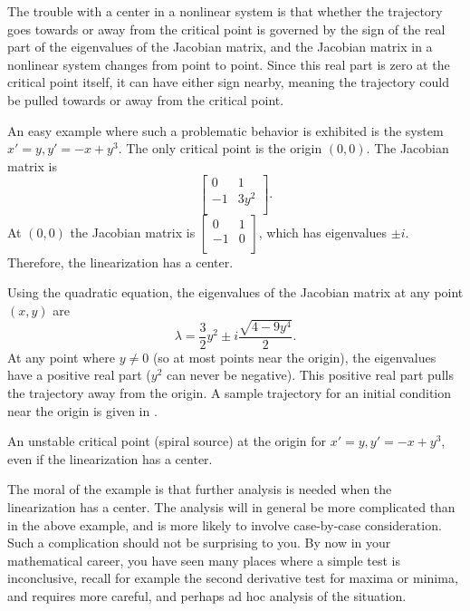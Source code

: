 The trouble with a center in a nonlinear system is that whether the
trajectory goes towards or away from the critical point is governed by the
sign of the real part of the eigenvalues of the Jacobian matrix, and the Jacobian
matrix
in a nonlinear system changes from point to point.  Since this real
part is zero at the critical point itself, it can have either sign nearby,
meaning the trajectory could be pulled towards or away from the critical
point.

\begin{example}
An easy example where such a problematic behavior is exhibited is the system
$x'=y, y' = -x+y^3$.  The only critical point
is the origin $(0,0)$.  The Jacobian matrix is 
\begin{equation*}
\begin{bmatrix}
0 & 1 \\
-1 & 3 y^2 \\
\end{bmatrix} .
\end{equation*}
At 
$(0,0)$ the Jacobian matrix is
$\left[ \begin{smallmatrix}
0 & 1 \\
-1 & 0 \\
\end{smallmatrix} \right]$, which has eigenvalues $\pm i$.  Therefore, the
linearization has a center.

Using the quadratic equation, the eigenvalues of the
Jacobian matrix at any point $(x,y)$ are
\begin{equation*}
\lambda = 
\frac{3}{2}y^2 \pm
i
\frac{\sqrt{4-9y^4}}{2} .
\end{equation*}
At any point where $y \not= 0$ (so at most points near the origin), the eigenvalues have a positive real part ($y^2$ can
never be negative).  This positive real part 
pulls the trajectory away from the origin.  A sample trajectory for an
initial condition near the origin is given in
.
\begin{myfig}
\capstart
{}
\caption{An unstable critical point (spiral source) at the origin
for $x'=y, y' = -x+y^3$, even if the linearization has a center.  \label{fig:nlin-unstable-center}}
\end{myfig}
\end{example}

The moral of the example is that further analysis is needed when the
linearization has a center.  The analysis will in general be more
complicated than in the above example, and is more likely to involve
case-by-case consideration.  Such a complication should not be
surprising to you.  By now in your mathematical career, you have
seen many places where a simple test is inconclusive, recall for example
the second derivative test for maxima or minima, and requires more careful,
and perhaps ad hoc analysis of the situation.

